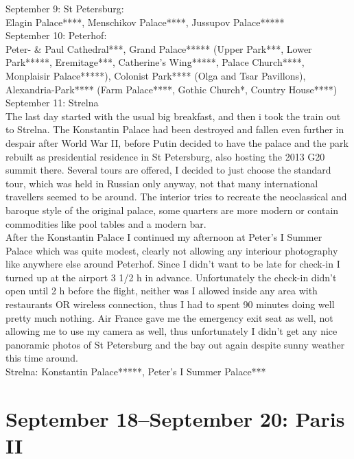 September 9: St Petersburg:\\
Elagin Palace****, Menschikov Palace****, Jussupov Palace*****\\

September 10: Peterhof:\\
Peter- \& Paul Cathedral***, Grand Palace***** (Upper Park***, Lower Park*****, Eremitage***, Catherine's Wing*****, Palace Church****, Monplaisir Palace*****), Colonist Park**** (Olga and Tsar Pavillons), Alexandria-Park**** (Farm Palace****, Gothic Church*, Country House****)\\

September 11: Strelna\\
The last day started with the usual big breakfast, and then i took the train out to Strelna. The Konstantin Palace had been destroyed and fallen even further in despair after World War II, before Putin decided to have the palace and the park rebuilt as presidential residence in St Petersburg, also hosting the 2013 G20 summit there. Several tours are offered, I decided to just choose the standard tour, which was held in Russian only anyway, not that many international travellers seemed to be around. The interior tries to recreate the neoclassical and baroque style of the original palace, some quarters are more modern or contain commodities like pool tables and a modern bar.\\
After the Konstantin Palace I continued my afternoon at Peter's I Summer Palace which was quite modest, clearly not allowing any interiour photography like anywhere else around Peterhof. Since I didn't want to be late for check-in I turned up at the airport 3 1/2 h in advance. Unfortunately the check-in didn't open until 2 h before the flight, neither was I allowed inside any area with restaurants OR wireless connection, thus I had to spent 90 minutes doing well pretty much nothing. Air France gave me the emergency exit seat as well, not allowing me to use my camera as well, thus unfortunately I didn't get any nice panoramic photos of St Petersburg and the bay out again despite sunny weather this time around.\\

Strelna: Konstantin Palace*****, Peter's I Summer Palace***\\

\section{September 18--September 20: Paris II}
\label{2015ParisII}

